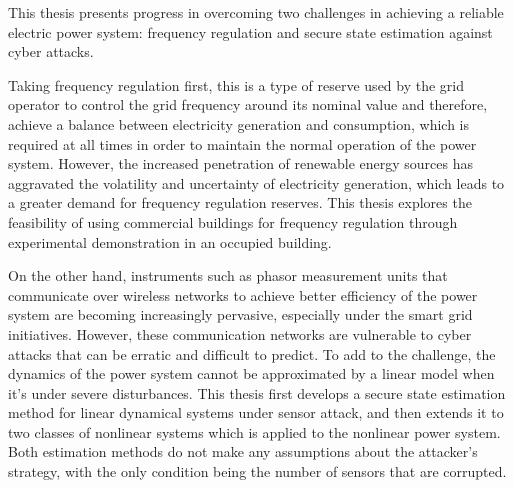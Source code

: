 \documentclass[12pt, oneside, final]{lib/ucthesis}
\begin{document}
\begin{frontmatter} 
\maketitle
\copyrightpage
\abstract
This thesis presents progress in overcoming two challenges in achieving a reliable electric power system: frequency regulation and secure state estimation against cyber attacks.

Taking frequency regulation first, this is a type of reserve used by the grid operator to control the grid frequency around its nominal value and therefore, achieve a balance between electricity generation and consumption, which is required at all times in order to maintain the normal operation of the power system.
However, the increased penetration of renewable energy sources has aggravated the volatility and uncertainty of electricity generation, which leads to a greater demand for frequency regulation reserves.
This thesis explores the feasibility of using commercial buildings for frequency regulation through experimental demonstration in an occupied building.

On the other hand, instruments such as phasor measurement units that communicate over wireless networks to achieve better efficiency of the power system are becoming increasingly pervasive, especially under the smart grid initiatives. 
However, these communication networks are vulnerable to cyber attacks that can be erratic and difficult to predict.
To add to the challenge, the dynamics of the power system cannot be approximated by a linear model when it's under severe disturbances.
This thesis first develops a secure state estimation method for linear dynamical systems under sensor attack, and then extends it to two classes of nonlinear systems which is applied to the nonlinear power system.
Both estimation methods do not make any assumptions about the attacker's strategy, with the only condition being the number of sensors that are corrupted.

\endabstract

\end{frontmatter}
\begin{optionalFrontMatter}
%
\end{optionalFrontMatter}
\end{document}

